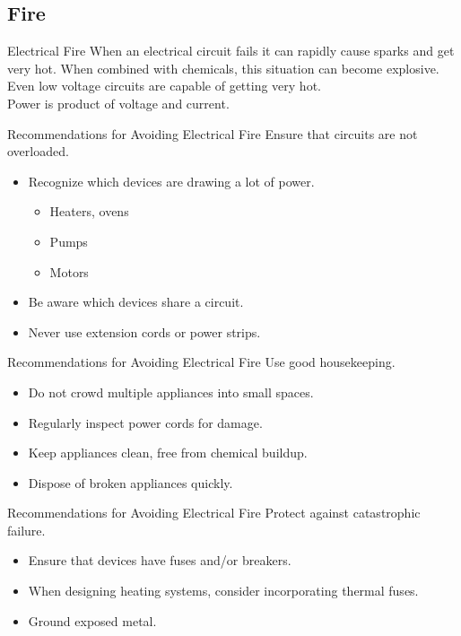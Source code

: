 \documentclass{presentation}
\begin{document}
\subsection{Fire}

\begin{frame}{Electrical Fire}
  When an electrical circuit fails it can rapidly cause sparks and get very hot.
  \vfill
  When combined with chemicals, this situation can become explosive.
  \vfill
  Even low voltage circuits are capable of getting very hot. \\
  Power is product of voltage and current.
\end{frame}

\begin{frame}{Recommendations for Avoiding Electrical Fire}
  Ensure that circuits are not overloaded.
  \begin{itemize}
    \item Recognize which devices are drawing a lot of power.
    \begin{itemize}
      \item Heaters, ovens
      \item Pumps
      \item Motors
    \end{itemize}
    \item Be aware which devices share a circuit.
    \item Never use extension cords or power strips.
  \end{itemize}
\end{frame}

\begin{frame}{Recommendations for Avoiding Electrical Fire}
  Use good housekeeping.
  \begin{itemize}
    \item Do not crowd multiple appliances into small spaces.
    \item Regularly inspect power cords for damage.
    \item Keep appliances clean, free from chemical buildup.
    \item Dispose of broken appliances quickly.
  \end{itemize}
\end{frame}

\begin{frame}{Recommendations for Avoiding Electrical Fire}
  Protect against catastrophic failure.
  \begin{itemize}
    \item Ensure that devices have fuses and/or breakers.
    \item When designing heating systems, consider incorporating thermal fuses.
    \item Ground exposed metal.
  \end{itemize}
\end{frame}
\end{document}
